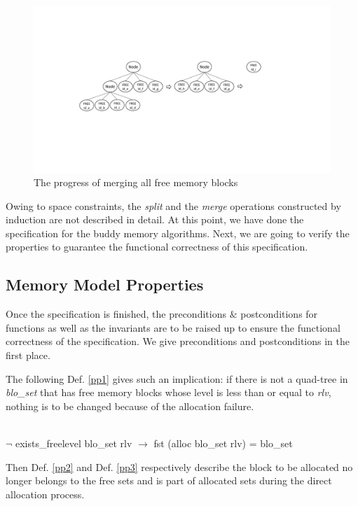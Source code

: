 \begin{figure}
	\centering
	\includegraphics[width=1\textwidth]{fig2.pdf}
	\caption{The progress of merging all free memory blocks}
	\label{fig2}
\end{figure}

Owing to space constraints, the \emph{split} and the \emph{merge} operations constructed by induction are not described in detail. At this point, we have done the specification for the buddy memory algorithms. Next, we are going to verify the properties to guarantee the functional correctness of this specification.

\subsection{Memory Model Properties}
Once the specification is finished, the preconditions $\&$ postconditions for functions as well as the invariants are to be raised up to ensure the functional correctness of the specification. We give preconditions and postconditions in the first place.

The following Def. \ref{pp1} gives such an implication: if there is not a quad-tree in \emph{blo\_set} that has free memory blocks whose level is less than or equal to \emph{rlv}, nothing is to be changed because of the allocation failure.

\begin{definition}  \\
	$\neg$ exists\_freelevel blo\_set rlv $\longrightarrow$ fst (alloc blo\_set rlv) = blo\_set
	\label{pp1}
\end{definition}

Then Def. \ref{pp2} and Def. \ref{pp3} respectively describe the block to be allocated no longer belongs to the free sets and is part of allocated sets during the direct allocation process.

